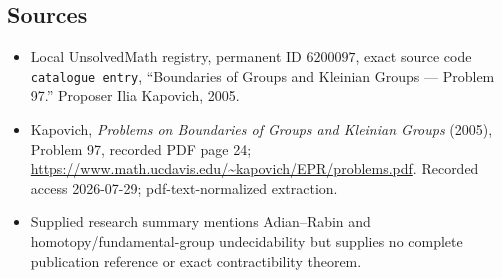 \documentclass[11pt]{article}
\begin{document}
\subsection{Sources}
\begin{itemize}
\item Local UnsolvedMath registry, permanent ID \(6200097\), exact source code \texttt{catalogue entry}, ``Boundaries of Groups and Kleinian Groups --- Problem 97.'' Proposer Ilia Kapovich, 2005.
\item Kapovich, \emph{Problems on Boundaries of Groups and Kleinian Groups} (2005), Problem 97, recorded PDF page 24; \url{https://www.math.ucdavis.edu/~kapovich/EPR/problems.pdf}. Recorded access 2026-07-29; pdf-text-normalized extraction.
\item Supplied research summary mentions Adian--Rabin and homotopy/fundamental-group undecidability but supplies no complete publication reference or exact contractibility theorem.
\end{itemize}
\end{document}
